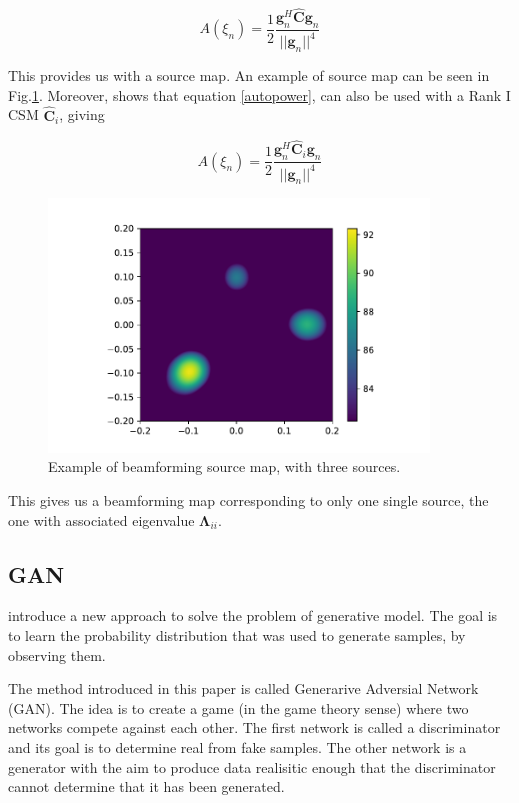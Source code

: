 \documentclass[11pt,a4paper,twoside]{report}
\begin{document}
\begin{equation}
    \label{autopower}
    A(\xi_n) = \frac{1}{2} \frac{\mathbf{g}_{n}^H \hat{\mathbf{C}} \mathbf{g}_{n}}{||\mathbf{g}_{n}||^4}
\end{equation}

This provides us with a source map. An example of source map can be seen in Fig.\ref{fig:beamforming_example}. Moreover, \cite{sarradj2010fast} shows that equation \ref{autopower}, can also be used with a Rank I CSM $\hat{\mathbf{C}}_i$, giving

\begin{equation}
    A(\xi_n) = \frac{1}{2} \frac{\mathbf{g}_{n}^H \hat{\mathbf{C}}_i \mathbf{g}_{n}}{||\mathbf{g}_{n}||^4}
\end{equation}

\begin{figure}
    \centering
    \includegraphics[width=0.9\textwidth]{figs/beamforming_example.pdf}
    \caption{Example of beamforming source map, with three sources.}
    \label{fig:beamforming_example}    
\end{figure}

This gives us a beamforming map corresponding to only one single source, the one with associated eigenvalue $\mathbf{\Lambda}_{ii}$.


\subsection{GAN}

\cite{goodfellow2020generative} introduce a new approach to solve the problem of generative model. The goal is to learn the probability distribution that was used to generate samples, by observing them.

The method introduced in this paper is called Generarive Adversial Network (GAN). The idea is to create a game (in the game theory sense) where two networks compete against each other. The first network is called a discriminator and its goal is to determine real from fake samples. The other network is a  generator with the aim to produce data realisitic enough that the discriminator cannot determine that it has been generated.
\end{document}
